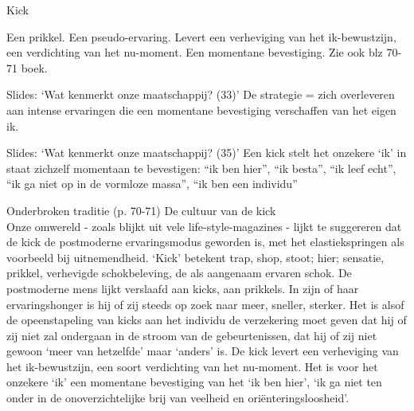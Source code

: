 \documentclass[main.tex]{subfiles}
\begin{document}
\begin{examenvraag}
    \begin{vraag}
        Kick
    \end{vraag}

    \begin{antwoord}
        Een prikkel.
        Een pseudo-ervaring.
        Levert een verheviging van het ik-bewustzijn, een verdichting van het nu-moment.
        Een momentane bevestiging. Zie ook blz 70-71 boek.
        \begin{citaat}{Slides: `Wat kenmerkt onze maatschappij? (33)'}
            De strategie = zich overleveren aan intense ervaringen die een momentane bevestiging verschaffen van het eigen ik.
        \end{citaat}
        \begin{citaat}{Slides: `Wat kenmerkt onze maatschappij? (35)'}
            Een kick stelt het onzekere `ik' in staat zichzelf momentaan te bevestigen: ``ik ben hier'', ``ik besta'', ``ik leef echt'', ``ik ga niet op in de vormloze massa'', ``ik ben een individu''
        \end{citaat}
        \begin{citaat}{Onderbroken traditie (p. 70-71)}
            De cultuur van de kick\\
            Onze omwereld - zoals blijkt uit vele life-style-magazines - lijkt te suggereren dat de kick de postmoderne ervaringsmodus geworden is, met het elastiekspringen als voorbeeld bij uitnemendheid.
            `Kick' betekent trap, shop, stoot; hier; sensatie, prikkel, verhevigde schokbeleving, de als aangenaam ervaren schok.
            De postmoderne mens lijkt verslaafd aan kicks, aan prikkels.
            In zijn of haar ervaringshonger is hij of zij steeds op zoek naar meer, sneller, sterker.
            Het is alsof de opeenstapeling van kicks aan het individu de verzekering moet geven dat hij of zij niet zal ondergaan in de stroom van de gebeurtenissen, dat hij of zij niet gewoon `meer van hetzelfde' maar `anders' is.
            De kick levert een verheviging van het ik-bewustzijn, een soort verdichting van het nu-moment.
            Het is voor het onzekere `ik' een momentane bevestiging van het `ik ben hier', `ik ga niet ten onder in de onoverzichtelijke brij van veelheid en ori\"enteringsloosheid'.
        \end{citaat}
    \end{antwoord}
\end{examenvraag}
\end{document}
